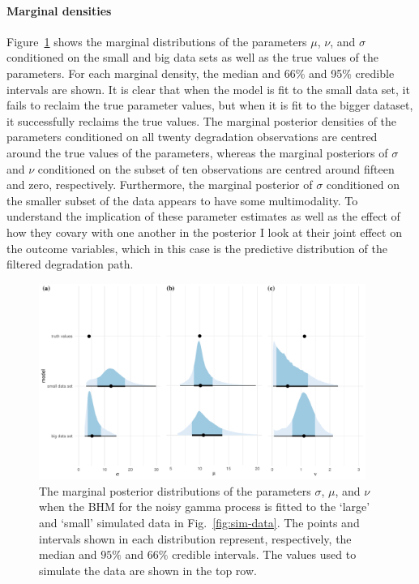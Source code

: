 \paragraph*{Marginal densities}
Figure~\ref{fig:marginal-post} shows the marginal distributions of the parameters $\mu$, $\nu$, and $\sigma$ conditioned on the small and big data sets as well as the true values of the parameters. For each marginal density, the median and 66\% and 95\% credible intervals are shown. It is clear that when the model is fit to the small data set, it fails to reclaim the true parameter values, but when it is fit to the bigger dataset, it successfully reclaims the true values. The marginal posterior densities of the parameters conditioned on all twenty degradation observations are centred around the true values of the parameters, whereas the marginal posteriors of $\sigma$ and $\nu$ conditioned on the subset of ten observations are centred around fifteen and zero, respectively. Furthermore, the marginal posterior of $\sigma$ conditioned on the smaller subset of the data appears to have some multimodality. To understand the implication of these parameter estimates as well as the effect of how they covary with one another in the posterior I look at their joint effect on the outcome variables, which in this case is the predictive distribution of the filtered degradation path.

\begin{figure}
  \centering
  \includegraphics[width=0.95\textwidth]{./figures/ch-4/marginal-posterior_a.pdf}
  \caption{The marginal posterior distributions of the parameters $\sigma$, $\mu$, and $\nu$ when the BHM for the noisy gamma process is fitted to the `large' and `small' simulated data in Fig.~\ref{fig:sim-data}. The points and intervals shown in each distribution represent, respectively, the median and $95\%$ and $66\%$ credible intervals. The values used to simulate the data are shown in the top row.}
  \label{fig:marginal-post}
\end{figure}

